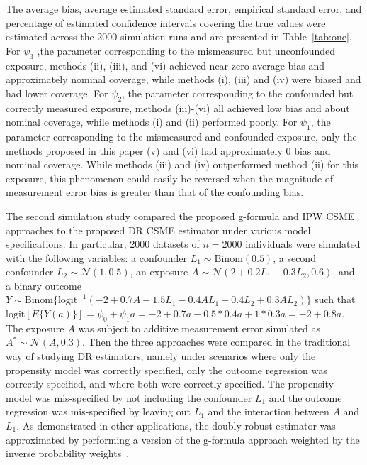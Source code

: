 \documentclass[useAMS,usenatbib,referee]{biom}
\begin{document}
The average bias, average estimated standard error, empirical standard error, and percentage of estimated confidence intervals covering the true values were estimated across the 2000 simulation runs and are presented in Table~\ref{tab:one}. For $\psi_{3}$ ,the parameter corresponding to the mismeasured but unconfounded exposure, methods (ii), (iii), and (vi) achieved near-zero average bias and approximately nominal coverage, while methods (i), (iii) and (iv) were biased and had lower coverage. For $\psi_{2}$, the parameter corresponding to the confounded but correctly measured exposure, methods (iii)-(vi) all achieved low bias and about nominal coverage, while methods (i) and (ii) performed poorly. For $\psi_{1}$, the parameter corresponding to the mismeasured and confounded exposure, only the methods proposed in this paper (v) and (vi) had approximately 0 bias and nominal coverage. While methods (iii) and (iv) outperformed method (ii) for this exposure, this phenomenon could easily be reversed when the magnitude of measurement error bias is greater than that of the confounding bias.

The second simulation study compared the proposed g-formula and IPW CSME approaches to the proposed DR CSME estimator under various model specifications. In particular, 2000 datasets of $n = 2000$ individuals were simulated with the following variables: a confounder $L_{1} \sim \text{Binom}(0.5)$, a second confounder $L_{2} \sim \mathcal{N}(1, 0.5)$, an exposure $A \sim \mathcal{N}(2 + 0.2L_{1} - 0.3L_{2}, 0.6)$, and a binary outcome $Y \sim \text{Binom}\{ \text{logit}^{-1}(-2 + 0.7A - 1.5L_{1} - 0.4AL_{1} -0.4L_{2} + 0.3AL_{2}) \}$ such that $\text{logit}[E \{ Y(a) \} ] = \psi_{0} + \psi_{1}a = -2 + 0.7a - 0.5*0.4a + 1*0.3a = -2 + 0.8a$. The exposure $A$ was subject to additive measurement error simulated as $A^{*} \sim \mathcal{N}(A, 0.3)$. Then the three approaches were compared in the traditional way of studying DR estimators, namely under scenarios where only the propensity model was correctly specified, only the outcome regression was correctly specified, and where both were correctly specified. The propensity model was mis-specified by not including the confounder $L_{1}$ and the outcome regression was mis-specified by leaving out $L_{1}$ and the interaction between $A$ and $L_{1}$. As demonstrated in other applications, the doubly-robust estimator was approximated by performing a version of the g-formula approach weighted by the inverse probability weights~\citep{hirano2001}.
\end{document}
